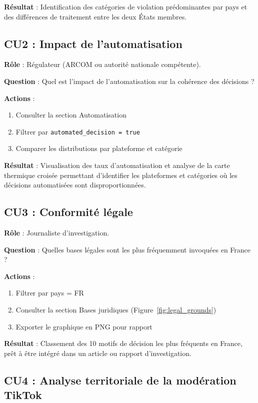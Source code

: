 \documentclass[10pt,twocolumn,a4paper]{article}
\begin{document}
\textbf{Résultat} : Identification des catégories de violation prédominantes par pays et des différences de traitement entre les deux États membres.

\subsection{CU2 : Impact de l'automatisation}

\textbf{Rôle} : Régulateur (ARCOM ou autorité nationale compétente).

\textbf{Question} : Quel est l'impact de l'automatisation sur la cohérence des décisions ?

\textbf{Actions} :
\begin{enumerate}
    \item Consulter la section Automatisation
    \item Filtrer par \texttt{automated\_decision = true}
    \item Comparer les distributions par plateforme et catégorie
\end{enumerate}

\textbf{Résultat} : Visualisation des taux d'automatisation et analyse de la carte thermique croisée permettant d'identifier les plateformes et catégories où les décisions automatisées sont disproportionnées.

\subsection{CU3 : Conformité légale}

\textbf{Rôle} : Journaliste d'investigation.

\textbf{Question} : Quelles bases légales sont les plus fréquemment invoquées en France ?

\textbf{Actions} :
\begin{enumerate}
    \item Filtrer par pays = FR
    \item Consulter la section Bases juridiques (Figure~\ref{fig:legal_grounds})
    \item Exporter le graphique en PNG pour rapport
\end{enumerate}

\textbf{Résultat} : Classement des 10 motifs de décision les plus fréquents en France, prêt à être intégré dans un article ou rapport d'investigation.

\subsection{CU4 : Analyse territoriale de la modération TikTok}
\end{document}
